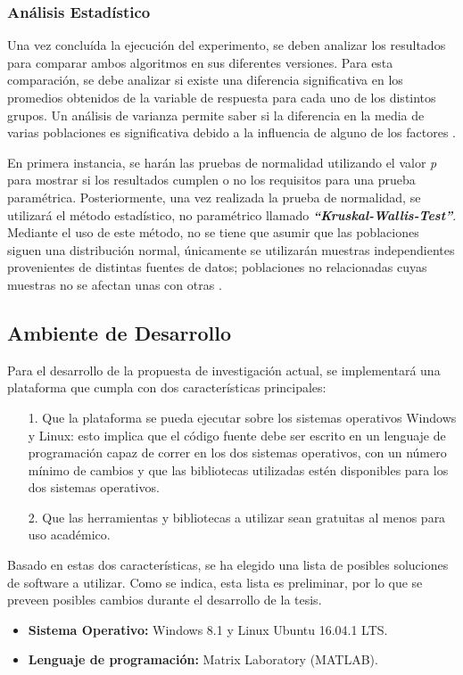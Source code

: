 \subsubsection{An\'alisis Estad\'istico}
Una vez conclu\'ida la ejecuci\'on del experimento, se deben analizar los resultados para comparar ambos algoritmos en sus diferentes versiones. Para esta comparaci\'on, se debe analizar si existe una diferencia significativa en los promedios obtenidos de la variable de respuesta para cada uno de los distintos grupos.
Un an\'alisis de varianza permite saber si la diferencia en la media de varias poblaciones es significativa debido a la influencia de alguno de los factores \cite{designexp}.\par 
En primera instancia, se har\'an las pruebas de normalidad utilizando el valor \textit{p} para mostrar si los resultados cumplen o no los requisitos para una prueba param\'etrica. Posteriormente, una vez realizada la prueba de normalidad, se utilizar\'a el m\'etodo estad\'istico, no param\'etrico llamado \textit{\textbf{\enquote{Kruskal-Wallis-Test}}}. Mediante el uso de este m\'etodo, no se tiene que asumir que las poblaciones siguen una distribuci\'on normal, \'unicamente se utilizar\'an muestras independientes provenientes de distintas fuentes de datos; poblaciones no relacionadas cuyas muestras no se afectan unas con otras \cite{kruskwal}.
\subsection{Ambiente de Desarrollo}
Para el desarrollo de la propuesta de investigaci\'on actual, se implementar\'a una plataforma que cumpla con dos caracter\'isticas principales:
\begin{itemize}
\item [1.] Que la plataforma se pueda ejecutar sobre los sistemas operativos Windows y Linux: esto implica que el c\'odigo fuente debe ser escrito en un lenguaje de programaci\'on capaz de correr en los dos sistemas operativos, con un n\'umero m\'inimo de cambios y que las bibliotecas utilizadas est\'en disponibles para los dos sistemas operativos.
\item [2.] Que las herramientas y bibliotecas a utilizar sean gratuitas al menos para uso acad\'emico.
\end{itemize}
Basado en estas dos caracter\'isticas, se ha elegido una lista de posibles soluciones de software a utilizar. Como se indica, esta lista es preliminar, por lo que se preveen posibles cambios durante el desarrollo de la tesis.
\begin{itemize}
\item \textbf{Sistema Operativo:} Windows 8.1 y Linux Ubuntu 16.04.1 LTS.
\item \textbf{Lenguaje de programaci\'on:} Matrix Laboratory (MATLAB).
\end{itemize}

